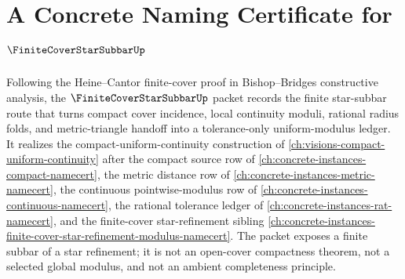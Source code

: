\chapter{A Concrete Naming Certificate for $\FiniteCoverStarSubbarUp$}
\label{ch:concrete-instances-finite-cover-star-subbar-namecert}

Following the Heine--Cantor finite-cover proof in Bishop--Bridges constructive analysis, the $\FiniteCoverStarSubbarUp$ packet records the finite star-subbar route that turns compact cover incidence, local continuity moduli, rational radius folds, and metric-triangle handoff into a tolerance-only uniform-modulus ledger. It realizes the compact-uniform-continuity construction of \autoref{ch:visions-compact-uniform-continuity} after the compact source row of \autoref{ch:concrete-instances-compact-namecert}, the metric distance row of \autoref{ch:concrete-instances-metric-namecert}, the continuous pointwise-modulus row of \autoref{ch:concrete-instances-continuous-namecert}, the rational tolerance ledger of \autoref{ch:concrete-instances-rat-namecert}, and the finite-cover star-refinement sibling \autoref{ch:concrete-instances-finite-cover-star-refinement-modulus-namecert}. The packet exposes a finite subbar of a star refinement; it is not an open-cover compactness theorem, not a selected global modulus, and not an ambient completeness principle.

